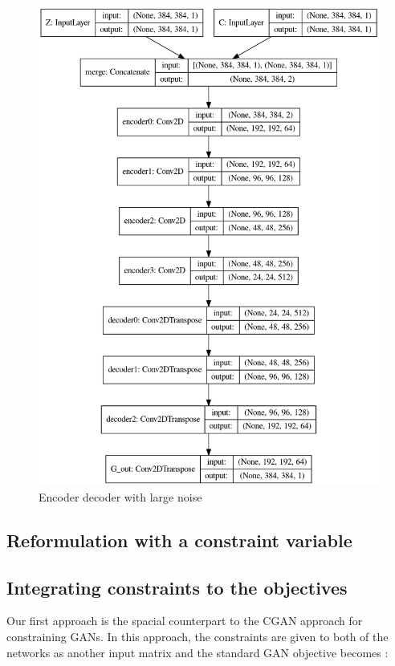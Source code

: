 \documentclass{article}
\begin{document}
		\begin{figure}
		\centering
		\includegraphics[scale=0.45]{encoder_decoder_large_noise.png}
		\caption{Encoder decoder with large noise}
		\end{figure}

	\subsection{Reformulation with a constraint variable}
	
		\subsection{Integrating constraints to the objectives}
	
	Our first approach is the spacial counterpart to the CGAN approach  for constraining GANs. In this approach, the constraints are given to both of the networks as another input matrix and the standard GAN objective becomes :
	
\end{document}
